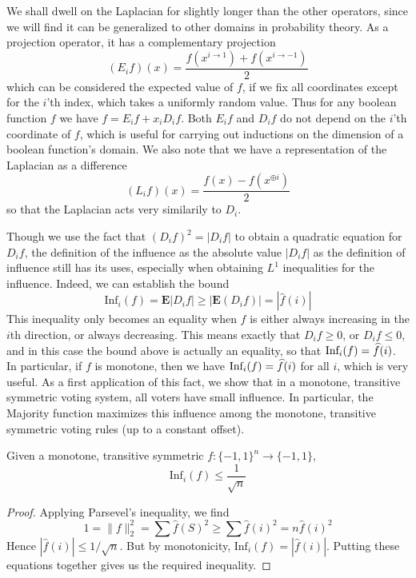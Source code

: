 We shall dwell on the Laplacian for slightly longer than the other operators, since we will find it can be generalized to other domains in probability theory. As a projection operator, it has a complementary projection
%
\[ (E_i f)(x) = \frac{f(x^{i \to 1}) + f(x^{i \to -1})}{2} \]
%
which can be considered the expected value of $f$, if we fix all coordinates except for the $i$'th index, which takes a uniformly random value. Thus for any boolean function $f$ we have $f = E_i f + x_i D_i f$. Both $E_i f$ and $D_i f$ do not depend on the $i$'th coordinate of $f$, which is useful for carrying out inductions on the dimension of a boolean function's domain. We also note that we have a representation of the Laplacian as a difference
%
\[ (L_i f)(x) = \frac{f(x) - f(x^{\oplus i})}{2} \]
%
so that the Laplacian acts very similarily to $D_i$.

Though we use the fact that $(D_if)^2 = |D_if|$ to obtain a quadratic equation for $D_i f$, the definition of the influence as the absolute value $|D_if|$ as the definition of influence still has its uses, especially when obtaining $L^1$ inequalities for the influence. Indeed, we can establish the bound
%
\[ \text{Inf}_i(f) = \mathbf{E}|D_if| \geq \left| \mathbf{E}(D_i f) \right| = | \widehat{f}(i) | \]
%
This inequality only becomes an equality when $f$ is either always increasing in the $i$th direction, or always decreasing. This means exactly that $D_i f \geq 0$, or $D_i f \leq 0$, and in this case the bound above is actually an equality, so that $\text{Inf}_i(f) = \smash{\widehat{f}}(i)$. In particular, if $f$ is monotone, then we have $\text{Inf}_i(f) = \smash{\widehat{f}(i)}$ for all $i$, which is very useful. As a first application of this fact, we show that in a monotone, transitive symmetric voting system, all voters have small influence. In particular, the Majority function maximizes this influence among the monotone, transitive symmetric voting rules (up to a constant offset).

\begin{theorem}
    Given a monotone, transitive symmetric $f: \{ -1, 1 \}^n \to \{ -1, 1 \}$,
    \[ \text{Inf}_i(f) \leq \frac{1}{\sqrt{n}} \]
\end{theorem}
\begin{proof}
    Applying Parsevel's inequality, we find
    \[ 1 = \| f \|_2^2 = \sum \widehat{f}(S)^2 \geq \sum \widehat{f}(i)^2 = n \widehat{f}(i)^2 \]
    Hence $|\widehat{f}(i)| \leq 1/\sqrt{n}$. But by monotonicity, $\text{Inf}_i(f) = |\widehat{f}(i)|$. Putting these equations together gives us the required inequality.
\end{proof}

